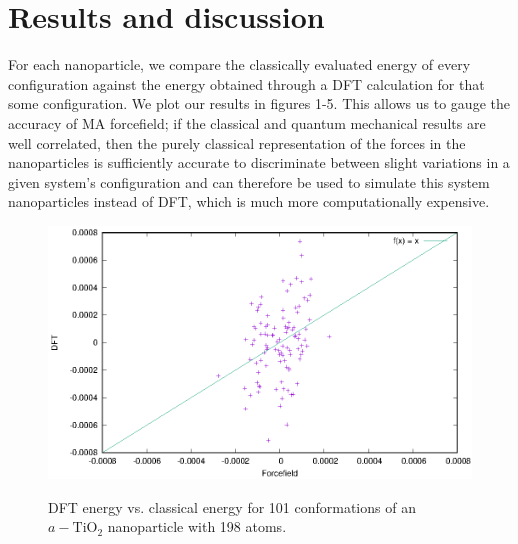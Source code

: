 \documentclass[aps,prb,twocolumn,amsmath,amssymb,superscriptaddress,longbibliography]{revtex4-1}
\newcommand\tab[1][1cm]{\hspace*{#1}} %
\begin{document}

\section*{Results and discussion}

\tab For each nanoparticle, we compare the classically evaluated energy of every configuration against the energy obtained through a DFT calculation for that some configuration. 
We plot our results in figures 1-5.
This allows us to gauge the accuracy of MA forcefield; if the classical and quantum mechanical results are well correlated, then the purely classical representation of the forces in the nanoparticles is sufficiently accurate to discriminate between slight variations in a given system's configuration and can therefore be used to simulate this system nanoparticles instead of DFT, which is much more computationally expensive.


\begin{figure}
\includegraphics[scale=1]{./plots/nnp_198_scaled}
\label{nnp_198}
\caption{DFT energy vs. classical energy for 101 conformations of an $a-\text{TiO}_2$ nanoparticle with 198 atoms.}
\end{figure}
\end{document}
